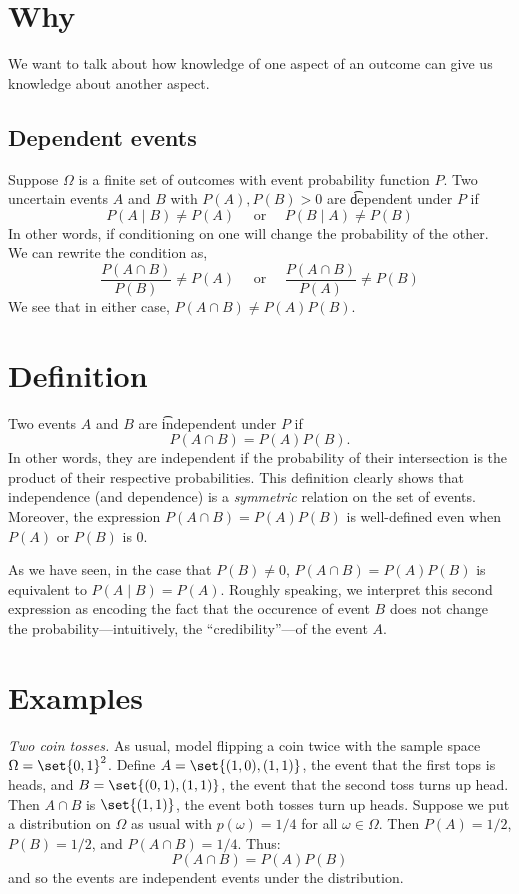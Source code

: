 
\section*{Why}

We want to talk about how knowledge of one aspect of an outcome can give us knowledge about another aspect.

\subsection*{Dependent events}

Suppose $\Omega $ is a finite set of outcomes with event probability function $P$.
Two uncertain events $A$ and $B$ with $P(A), P(B) > 0$ are \t{dependent} under $P$ if
\[
P(A \mid  B) \neq P(A) \quad \text{ or } \quad P(B \mid  A) \neq P(B)
\]
In other words, if conditioning on one will change the probability of the other.
We can rewrite the condition as,
\[
\frac{P(A \cap  B)}{P(B)} \neq P(A) \quad \text{ or } \quad \frac{P(A \cap  B)}{P(A)} \neq P(B)
\]
We see that in either case, $P(A \cap  B) \neq P(A)P(B)$.

\section*{Definition}

Two events $A$ and $B$ are \t{independent} under $P$ if
\[
P(A \cap  B) = P(A)P(B).
\]
In other words, they are independent if the probability of their intersection is the product of their respective probabilities.
This definition clearly shows that independence (and dependence) is a \textit{symmetric} relation on the set of events.
Moreover, the expression $P(A \cap  B) = P(A)P(B)$ is well-defined even when $P(A)$ or $P(B)$ is 0.

As we have seen, in the case that $P(B) \neq 0$, $P(A \cap B) = P(A)P(B)$ is equivalent to $P(A \mid B) = P(A)$.
Roughly speaking, we interpret this second expression as encoding the fact that the occurence of event $B$ does not change the probability---intuitively, the ``credibility''---of the event $A$.

\section*{Examples}

\textit{Two coin tosses.}
As usual, model flipping a coin twice with the sample space $\Omega  = \set{0,1}^2$.
Define $A = \set{(1,0), (1, 1)}$, the event that the first tops is heads, and $B = \set{(0,1), (1,1)}$, the event that the second toss turns up head.
Then $A \cap  B$ is $\set{(1,1)}$, the event both tosses turn up heads.
Suppose we put a distribution on $\Omega $ as usual with $p(\omega ) = 1/4$ for all $\omega  \in \Omega $.
Then $P(A) = 1/2$, $P(B) = 1/2$, and $P(A \cap  B) = 1/4$.
Thus:
\[
P(A \cap  B) = P(A)P(B)
\]
and so the events are independent events under the distribution.

